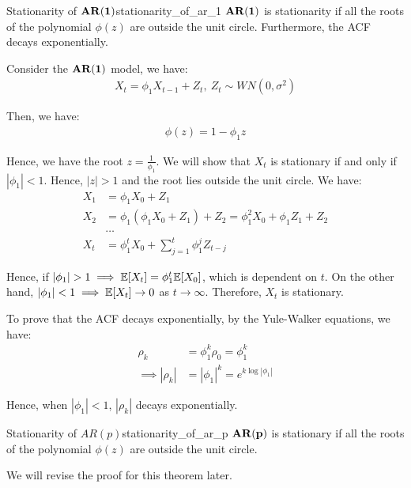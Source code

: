 \begin{theorem}{Stationarity of $\bf AR(1)$}{stationarity_of_ar_1}
    $\bf AR(1)$ is stationarity if all the roots of the polynomial $\phi(z)$ are outside the unit circle. Furthermore, the ACF decays exponentially.
\end{theorem}

\begin{proof*}
    Consider the $\bf AR(1)$ model, we have:
    \begin{align*}
        X_t = \phi_1X_{t-1} + Z_t, \ Z_t \sim WN(0,\sigma^2)
    \end{align*}

    \noindent Then, we have:
    \begin{align*}
        \phi(z) = 1 - \phi_1z
    \end{align*}

    \noindent Hence, we have the root $z = \frac{1}{\phi_1}$. We will show that $X_t$ is stationary if and only if $|\phi_1| < 1$. Hence, $|z| > 1$ and the root lies outside the unit circle. We have:
    \begin{align*}
        X_1 &= \phi_1X_0 + Z_1 \\
        X_2 &= \phi_1(\phi_1X_0 + Z_1) + Z_2 = \phi_1^2X_0 + \phi_1Z_1 + Z_2 \\
        &\dots \\
        X_t &= \phi_1^t X_0 + \sum_{j=1}^t \phi_1^j Z_{t-j}
    \end{align*}

    \noindent Hence, if $|\phi_1| > 1 \implies \mathbb{E}[X_t] = \phi_1^t \mathbb{E}[X_0]$, which is dependent on $t$. On the other hand, $|\phi_1| < 1 \implies \mathbb{E}[X_t]\to0$ as $t\to\infty$. Therefore, $X_t$ is stationary.

    \noindent To prove that the ACF decays exponentially, by the Yule-Walker equations, we have:
    \begin{align*}
        \rho_k &= \phi_1^k \rho_0 = \phi_1^k \\
        \implies |\rho_k| &= |\phi_1|^k = e^{k\log|\phi_1|}
    \end{align*}

    \noindent Hence, when $|\phi_1|< 1$, $|\rho_k|$ decays exponentially.
\end{proof*}

\begin{theorem}{Stationarity of $AR(p)$}{stationarity_of_ar_p}
    $\bf AR(p)$ is stationary if all the roots of the polynomial $\phi(z)$ are outside the unit circle.
\end{theorem}

\begin{proof*}
    We will revise the proof for this theorem later.
\end{proof*}
